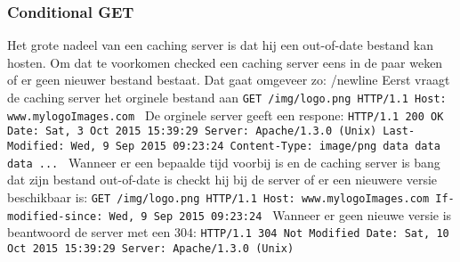 \subsubsection*{Conditional GET}
Het grote nadeel van een caching server is dat hij een out-of-date bestand kan hosten. Om dat te voorkomen checked een caching server eens in de paar weken of er geen nieuwer bestand bestaat. Dat gaat omgeveer zo:
/newline
Eerst vraagt de caching server het orginele bestand aan \newline
\texttt{GET /img/logo.png HTTP/1.1 \newline
		Host: www.mylogoImages.com \newline \newline
	}
De orginele server geeft een respone: \newline
\texttt{HTTP/1.1 200 OK \newline
		Date: Sat, 3 Oct 2015 15:39:29 \newline
		Server: Apache/1.3.0 (Unix) \newline
		Last-Modified: Wed, 9 Sep 2015 09:23:24 \newline
		Content-Type: image/png \newline \newline
		data data data ... \newline}
Wanneer er een bepaalde tijd voorbij is en de caching server is bang dat zijn bestand out-of-date is checkt hij bij de server of er een nieuwere versie beschikbaar is: \newline
\texttt{GET /img/logo.png HTTP/1.1 \newline
	Host: www.mylogoImages.com \newline
	If-modified-since: Wed, 9 Sep 2015 09:23:24 \newline \newline
}
Wanneer er geen nieuwe versie is beantwoord de server met een $304$: \newline
\texttt{HTTP/1.1 304 Not Modified \newline
	Date: Sat, 10 Oct 2015 15:39:29 \newline
	Server: Apache/1.3.0 (Unix) \newline}
	